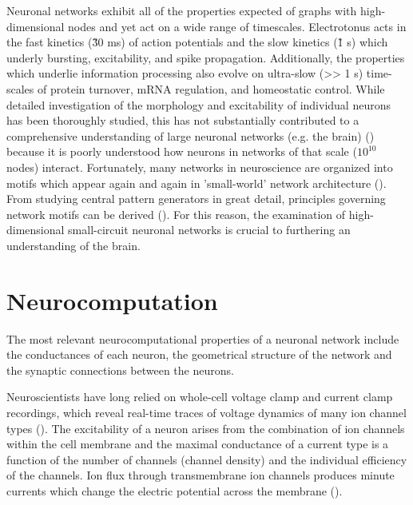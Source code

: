 \documentclass[14pt]{article}
\begin{document}
	Neuronal networks exhibit all of the properties expected of graphs with high-dimensional nodes and yet act on a wide range of timescales. Electrotonus acts in the fast kinetics (\~ 30 ms) of action potentials and the slow kinetics (\~ 1 s) which underly bursting, excitability, and spike propagation. Additionally, the properties which underlie information processing also evolve on ultra-slow (>> 1 s) time-scales of protein turnover, mRNA regulation, and homeostatic control. While detailed investigation of the morphology and excitability of individual neurons has been thoroughly studied, this has not substantially contributed to a comprehensive understanding of large neuronal networks (e.g. the brain) (\cite{KandelPrinciplesneuralscience2013}) because it is poorly understood how neurons in networks of that scale ($10^{10}$ nodes) interact. Fortunately, many networks in neuroscience are organized into motifs which appear again and again in 'small-world' network architecture (\cite{SpornsMotifsBrainNetworks2004}). From studying central pattern generators in great detail, principles governing network motifs can be derived (\cite{MarderCentralpatterngenerators2001a}). For this reason, the examination of high-dimensional small-circuit neuronal networks is crucial to furthering an understanding of the brain.
	
	\section{Neurocomputation}
	The most relevant neurocomputational properties of a neuronal network include the conductances of each neuron, the geometrical structure of the network and the synaptic connections between the neurons.
	
	Neuroscientists have long relied on whole-cell voltage clamp and current clamp recordings, which reveal real-time traces of voltage dynamics of many ion channel types (\cite{HilleIonChannelsExcitable2001}). The excitability of a neuron arises from the combination of ion channels within the cell membrane and the  maximal conductance of a current type is a function of the number of channels (channel density) and the individual efficiency of the channels. Ion flux through transmembrane ion channels produces minute currents which change the electric potential across the membrane (\cite{DayanTheoreticalNeuroscience2001}).
	
\end{document}

